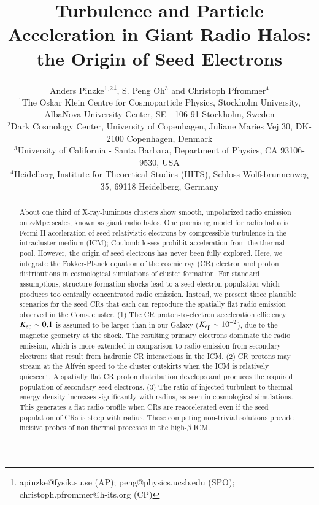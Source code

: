 \documentclass[a4paper,fleqn,usenatbib]{mnras}
\title[Origin of Seed Electrons]{Turbulence and Particle Acceleration in Giant Radio Halos: the Origin of Seed Electrons}
\author[A. Pinzke, S. Peng Oh and C. Pfrommer] 
{Anders Pinzke$^{1,2}$\thanks{apinzke@fysik.su.se (AP); peng@physics.ucsb.edu (SPO); christoph.pfrommer@h-its.org (CP)}, S. Peng Oh$^{3}$ and Christoph Pfrommer$^{4}$\footnotemark[1]\\
$^{1}$The Oskar Klein Centre for Cosmoparticle Physics, Stockholm University, AlbaNova University Center, SE - 106 91
  Stockholm, Sweden\\
$^{2}$Dark Cosmology Center, University of Copenhagen,
  Juliane Maries Vej 30, DK-2100 Copenhagen, Denmark\\
  $^{3}$University of California - Santa Barbara,
  Department of Physics, CA 93106-9530, USA\\
$^{4}$Heidelberg Institute for Theoretical Studies
  (HITS), Schloss-Wolfsbrunnenweg 35, 69118 Heidelberg, Germany}
\begin{document}
\pagerange{\pageref{firstpage}--\pageref{lastpage}} 
\maketitle
\label{firstpage}



 
\begin{abstract}
  About one third of X-ray-luminous clusters show smooth, unpolarized
  radio emission on $\sim$Mpc scales, known as giant radio halos. One
  promising model for radio halos is Fermi II acceleration of seed
  relativistic electrons by compressible turbulence in the
  intracluster medium (ICM); Coulomb losses prohibit acceleration from
  the thermal pool. However, the origin of seed electrons has never
  been fully explored. Here, we integrate the Fokker-Planck equation
  of the cosmic ray (CR) electron and proton distributions in
  cosmological simulations of cluster formation. For standard
  assumptions, structure formation shocks lead to a seed electron
  population which produces too centrally concentrated radio
  emission. Instead, we present three plausible scenarios for the seed
  CRs that each can reproduce the spatially flat radio emission
  observed in the Coma cluster. (1) The CR proton-to-electron
  acceleration efficiency $K_{\mathrm{ep}} \sim 0.1$ is assumed to be
  larger than in our Galaxy ($K_{\mathrm{ep}} \sim 10^{-2}$), due to the
  magnetic geometry at the shock. The resulting primary electrons
  dominate the radio emission, which is more extended in comparison to
  radio emission from secondary electrons that result from hadronic CR
  interactions in the ICM. (2) CR protons may stream at the Alfv{\'e}n
  speed to the cluster outskirts when the ICM is relatively
  quiescent. A spatially flat CR proton distribution develops and
  produces the required population of secondary seed electrons. (3)
  The ratio of injected turbulent-to-thermal energy density increases
  significantly with radius, as seen in cosmological simulations. This
  generates a flat radio profile when CRs are reaccelerated even if
  the seed population of CRs is steep with radius. These competing
  non-trivial solutions provide incisive probes of non thermal
  processes in the high-$\beta$ ICM.
\end{abstract} 

\end{document}

